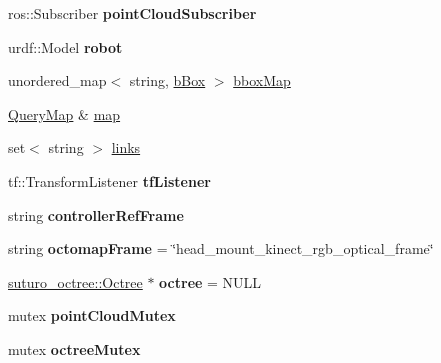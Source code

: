 \begin{DoxyCompactItemize}
\item 
\hypertarget{classCollisionScene_ae185f726a5ec8c68f92980eace1b613b}{ros\-::\-Subscriber {\bfseries point\-Cloud\-Subscriber}}\label{classCollisionScene_ae185f726a5ec8c68f92980eace1b613b}

\item 
\hypertarget{classCollisionScene_a09c519cf1c97e9e1c4d5d90197b8b404}{urdf\-::\-Model {\bfseries robot}}\label{classCollisionScene_a09c519cf1c97e9e1c4d5d90197b8b404}

\item 
unordered\-\_\-map$<$ string, \hyperlink{structCollisionScene_1_1bBox}{b\-Box} $>$ \hyperlink{classCollisionScene_a86929e1d07a315dec9e6c1b305cacabc}{bbox\-Map}
\item 
\hyperlink{classMutexMap}{Query\-Map} \& \hyperlink{classCollisionScene_a50300cec4b2a8bb3c3d51eef54acc0f8}{map}
\item 
set$<$ string $>$ \hyperlink{classCollisionScene_ab6fe95cec3f4207074aabedce8b4be61}{links}
\item 
\hypertarget{classCollisionScene_acf1bebb09bc150915efbb88ced9e3db1}{tf\-::\-Transform\-Listener {\bfseries tf\-Listener}}\label{classCollisionScene_acf1bebb09bc150915efbb88ced9e3db1}

\item 
\hypertarget{classCollisionScene_a59692641d55fc7b2c680429030749365}{string {\bfseries controller\-Ref\-Frame}}\label{classCollisionScene_a59692641d55fc7b2c680429030749365}

\item 
\hypertarget{classCollisionScene_a53afa27e7913804dfe9b77c72ff55c7a}{string {\bfseries octomap\-Frame} = \char`\"{}head\-\_\-mount\-\_\-kinect\-\_\-rgb\-\_\-optical\-\_\-frame\char`\"{}}\label{classCollisionScene_a53afa27e7913804dfe9b77c72ff55c7a}

\item 
\hypertarget{classCollisionScene_a7fae33d8e04f4b7db02b14e78220b9a4}{\hyperlink{classsuturo__octree_1_1Octree}{suturo\-\_\-octree\-::\-Octree} $\ast$ {\bfseries octree} = N\-U\-L\-L}\label{classCollisionScene_a7fae33d8e04f4b7db02b14e78220b9a4}

\item 
\hypertarget{classCollisionScene_a9957ef59711be6baa110dc8483c58afe}{mutex {\bfseries point\-Cloud\-Mutex}}\label{classCollisionScene_a9957ef59711be6baa110dc8483c58afe}

\item 
\hypertarget{classCollisionScene_af6a235ea3b7e74f8fe9f76cc5a186fe4}{mutex {\bfseries octree\-Mutex}}\label{classCollisionScene_af6a235ea3b7e74f8fe9f76cc5a186fe4}


\end{DoxyCompactItemize}
